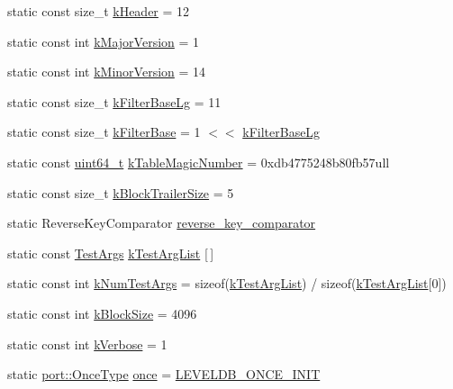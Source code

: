 \begin{DoxyCompactItemize}
static const size\-\_\-t \hyperlink{namespaceleveldb_a0c307b86a9e098703aa8aa0a55ce504a}{k\-Header} = 12
\item 
static const int \hyperlink{namespaceleveldb_ab5f58e0e9055bf647e6b92dc8b69c11f}{k\-Major\-Version} = 1
\item 
static const int \hyperlink{namespaceleveldb_afba0124470c60dd33b9d82838f40fc04}{k\-Minor\-Version} = 14
\item 
static const size\-\_\-t \hyperlink{namespaceleveldb_a84056738cd05489322f3480723d55d6d}{k\-Filter\-Base\-Lg} = 11
\item 
static const size\-\_\-t \hyperlink{namespaceleveldb_a98b7e84ea18ed9d60211fd297359cc78}{k\-Filter\-Base} = 1 $<$$<$ \hyperlink{namespaceleveldb_a84056738cd05489322f3480723d55d6d}{k\-Filter\-Base\-Lg}
\item 
static const \hyperlink{stdint_8h_aaa5d1cd013383c889537491c3cfd9aad}{uint64\-\_\-t} \hyperlink{namespaceleveldb_a4ea4fa6917989c12324b715f1b3069f8}{k\-Table\-Magic\-Number} = 0xdb4775248b80fb57ull
\item 
static const size\-\_\-t \hyperlink{namespaceleveldb_a4f00b102aae97cb0b0418b6f703a577e}{k\-Block\-Trailer\-Size} = 5
\item 
static Reverse\-Key\-Comparator \hyperlink{namespaceleveldb_a4f7cb0b6f4da1c10852632bfdb7dd227}{reverse\-\_\-key\-\_\-comparator}
\item 
static const \hyperlink{structleveldb_1_1_test_args}{Test\-Args} \hyperlink{namespaceleveldb_a6d7e1fb11fbc0e83ef27e87007c8a425}{k\-Test\-Arg\-List} \mbox{[}$\,$\mbox{]}
\item 
static const int \hyperlink{namespaceleveldb_a0bc857a7e9baff42f61503688957b6f5}{k\-Num\-Test\-Args} = sizeof(\hyperlink{namespaceleveldb_a6d7e1fb11fbc0e83ef27e87007c8a425}{k\-Test\-Arg\-List}) / sizeof(\hyperlink{namespaceleveldb_a6d7e1fb11fbc0e83ef27e87007c8a425}{k\-Test\-Arg\-List}\mbox{[}0\mbox{]})
\item 
static const int \hyperlink{namespaceleveldb_a6fb0b0eafa487f7c4940d210c77cece6}{k\-Block\-Size} = 4096
\item 
static const int \hyperlink{namespaceleveldb_af8897be0086c2db6e31344b7679c170a}{k\-Verbose} = 1
\item 
static \hyperlink{namespaceleveldb_1_1port_a80651a8fb458d9b7b3c1f492f9abd055}{port\-::\-Once\-Type} \hyperlink{namespaceleveldb_aaca89bbfe8c9115ec6faaf59a77ca965}{once} = \hyperlink{port__posix_8h_aa0f16c685b4ebb93ccc49f5ae36e1c9d}{L\-E\-V\-E\-L\-D\-B\-\_\-\-O\-N\-C\-E\-\_\-\-I\-N\-I\-T}
\item 
$$
\end{DoxyCompactItemize}
